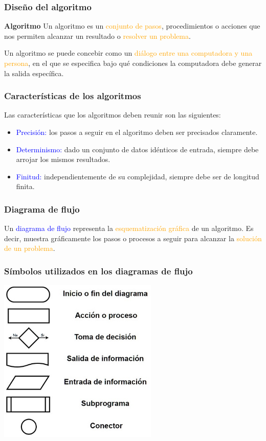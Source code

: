 \begin{frame}[t]
\frametitle{Diseño del algoritmo}
\begin{block}{\textbf{Algoritmo}}
Un algoritmo es un \textcolor{orange}{conjunto de pasos}, procedimientos o acciones que nos permiten alcanzar un resultado o \textcolor{orange}{resolver un problema}.
\end{block}
Un algoritmo se puede concebir como un \textcolor{orange}{diálogo entre una computadora y una persona}, en el que se especifica bajo qué condiciones la computadora debe generar la salida específica.
\end{frame}

\begin{frame}[t]
\frametitle{Características de los algoritmos}
Las características que los algoritmos deben reunir son las siguientes:
\begin{itemize}
    \item \textcolor{blue}{Precisión:} los pasos a seguir en el algoritmo deben ser precisados claramente. \pause
    \item \textcolor{blue}{Determinismo:} dado un conjunto de datos idénticos de entrada, siempre debe arrojar los mismos resultados. \pause
    \item \textcolor{blue}{Finitud:} independientemente de su complejidad, siempre debe ser de longitud finita. 
\end{itemize}
\end{frame}

\begin{frame}[t]
\frametitle{Diagrama de flujo}
Un \textcolor{blue}{diagrama de flujo} representa la \textcolor{orange}{esquematización gráfica} de un algoritmo. Es decir, muestra gráficamente los pasos o procesos a seguir para alcanzar la \textcolor{orange}{solución de un problema}.
\end{frame}

\begin{frame}[t]
\frametitle{Símbolos utilizados en los diagramas de flujo}
\begin{center}
    \includegraphics[width=0.57\textwidth]{figs/diagrama_flujo_simbolos}
\end{center}
\end{frame}

